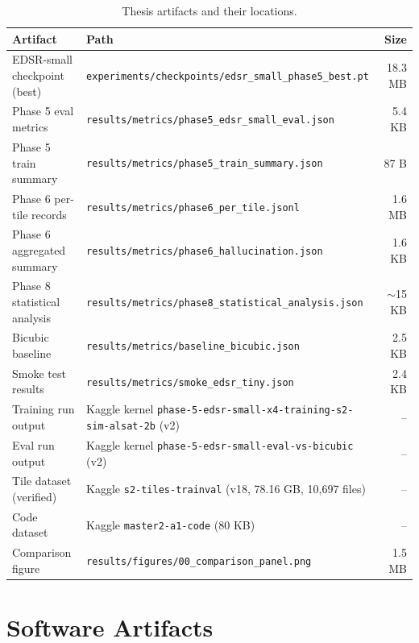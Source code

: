 \documentclass[12pt,a4paper]{report}
\begin{document}
\begin{table}[H]
\centering
\caption{Thesis artifacts and their locations.}
\label{tab:artifacts}
\begin{tabularx}{\textwidth}{l l r}
\toprule
Artifact & Path & Size \\
\midrule
EDSR-small checkpoint (best) & \texttt{experiments/checkpoints/edsr\_small\_phase5\_best.pt} & 18.3 MB \\
Phase 5 eval metrics & \texttt{results/metrics/phase5\_edsr\_small\_eval.json} & 5.4 KB \\
Phase 5 train summary & \texttt{results/metrics/phase5\_train\_summary.json} & 87 B \\
Phase 6 per-tile records & \texttt{results/metrics/phase6\_per\_tile.jsonl} & 1.6 MB \\
Phase 6 aggregated summary & \texttt{results/metrics/phase6\_hallucination.json} & 1.6 KB \\
Phase 8 statistical analysis & \texttt{results/metrics/phase8\_statistical\_analysis.json} & $\sim$15 KB \\
Bicubic baseline & \texttt{results/metrics/baseline\_bicubic.json} & 2.5 KB \\
Smoke test results & \texttt{results/metrics/smoke\_edsr\_tiny.json} & 2.4 KB \\
Training run output & Kaggle kernel \texttt{phase-5-edsr-small-x4-training-s2-sim-alsat-2b} (v2) & -- \\
Eval run output & Kaggle kernel \texttt{phase-5-edsr-small-eval-vs-bicubic} (v2) & -- \\
Tile dataset (verified) & Kaggle \texttt{s2-tiles-trainval} (v18, 78.16 GB, 10,697 files) & -- \\
Code dataset & Kaggle \texttt{master2-a1-code} (80 KB) & -- \\
Comparison figure & \texttt{results/figures/00\_comparison\_panel.png} & 1.5 MB \\
\bottomrule
\end{tabularx}
\end{table}

\chapter{Software Artifacts}
\end{document}
